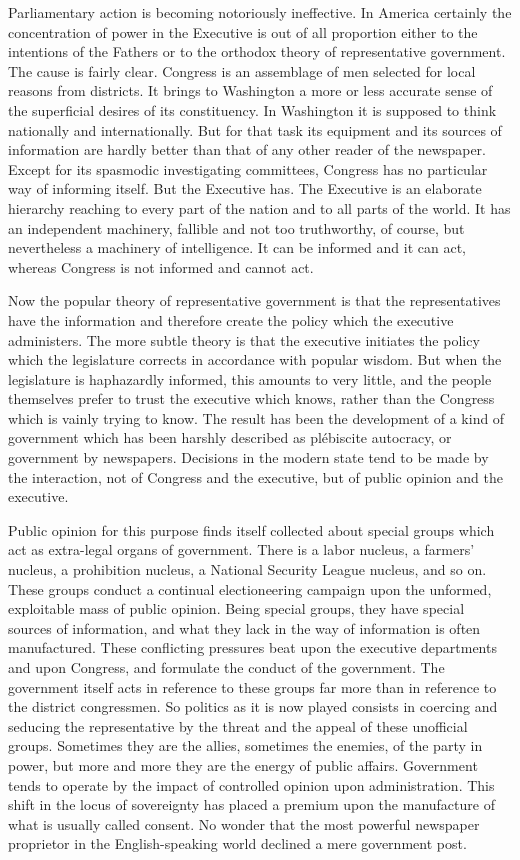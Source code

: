 \documentclass[openany,nobib,twoside,nohyper]{tufte-book}
\begin{document}
Parliamentary action is becoming notoriously ineffective. In America
certainly the concentration of power in the Executive is out of all
proportion either to the intentions of the Fathers or to the orthodox
theory of representative government. The cause is fairly clear. Congress
is an assemblage of men selected for local reasons from districts. It
brings to Washington a more or less accurate sense of the superficial
desires of its constituency. In Washington it is supposed to think
nationally and internationally. But for that task its equipment and its
sources of information are hardly better than that of any other reader
of the newspaper. Except for its spasmodic investigating committees,
Congress has no particular way of informing itself. But the Executive
has. The Executive is an elaborate hierarchy reaching to every part of
the nation and to all parts of the world. It has an independent
machinery, fallible and not too truthworthy, of course, but nevertheless
a machinery of intelligence. It can be informed and it can act, whereas
Congress is not informed and cannot act.

Now the popular theory of representative government is that the
representatives have the information and therefore create the policy
which the executive administers. The more subtle theory is that the
executive initiates the policy which the legislature corrects in
accordance with popular wisdom. But when the legislature is haphazardly
informed, this amounts to very little, and the people themselves prefer
to trust the executive which knows, rather than the Congress which is
vainly trying to know. The result has been the development of a kind of
government which has been harshly described as plébiscite autocracy, or
government by newspapers. Decisions in the modern state tend to be made
by the interaction, not of Congress and the executive, but of public
opinion and the executive.

Public opinion for this purpose finds itself collected about special
groups which act as extra-legal organs of government. There is a labor
nucleus, a farmers' nucleus, a prohibition nucleus, a National Security
League nucleus, and so on. These groups conduct a continual
electioneering campaign upon the unformed, exploitable mass of public
opinion. Being special groups, they have special sources of information,
and what they lack in the way of information is often manufactured.
These conflicting pressures beat upon the executive departments and upon
Congress, and formulate the conduct of the government. The government
itself acts in reference to these groups far more than in reference to
the district congressmen. So politics as it is now played consists in
coercing and seducing the representative by the threat and the appeal of
these unofficial groups. Sometimes they are the allies, sometimes the
enemies, of the party in power, but more and more they are the energy of
public affairs. Government tends to operate by the impact of controlled
opinion upon administration. This shift in the locus of sovereignty has
placed a premium upon the manufacture of what is usually called consent.
No wonder that the most powerful newspaper proprietor in the
English-speaking world declined a mere government post.
\end{document}
